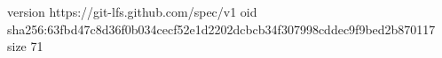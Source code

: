 version https://git-lfs.github.com/spec/v1
oid sha256:63fbd47c8d36f0b034cecf52e1d2202dcbcb34f307998cddec9f9bed2b870117
size 71
